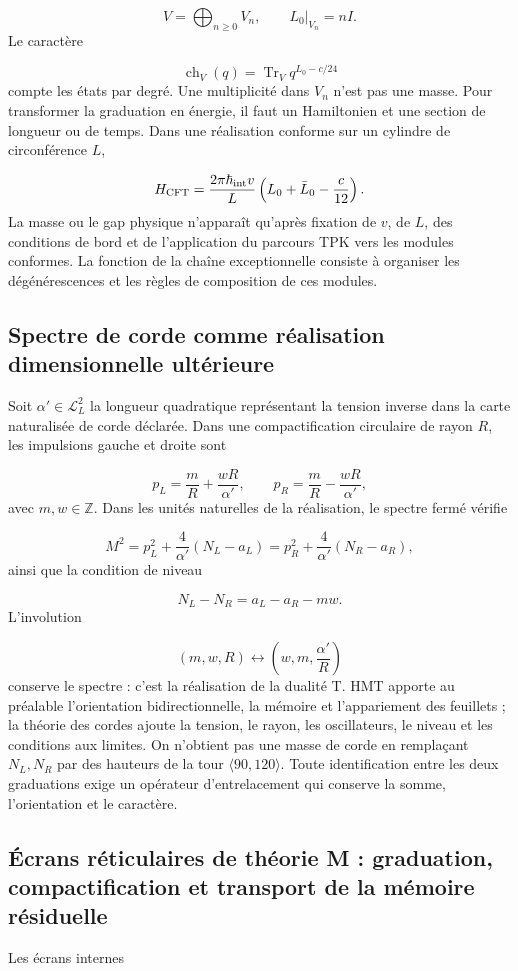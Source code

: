\[
V=\bigoplus_{n\ge0}V_n,
\qquad
L_0|_{V_n}=nI.
\]
Le caractère

\[
\operatorname{ch}_V(q)
=\operatorname{Tr}_V q^{L_0-c/24}
\]
compte les états par degré. Une multiplicité dans \(V_n\) n’est pas une masse. Pour transformer la graduation en énergie, il faut un Hamiltonien et une section de longueur ou de temps. Dans une réalisation conforme sur un cylindre de circonférence \(L\),

\[
H_{\rm CFT}
=\frac{2\pi\hbar_{\rm int}v}{L}
\left(L_0+\bar L_0-\frac{c}{12}\right).
\]
La masse ou le gap physique n’apparaît qu’après fixation de \(v\), de \(L\), des conditions de bord et de l’application du parcours TPK vers les modules conformes. La fonction de la chaîne exceptionnelle consiste à organiser les dégénérescences et les règles de composition de ces modules.

\subsection{Spectre de corde comme réalisation dimensionnelle ultérieure}
Soit \(\alpha'\in\mathcal L_L^2\) la longueur quadratique représentant la tension inverse dans la carte naturalisée de corde déclarée. Dans une compactification circulaire de rayon \(R\), les impulsions gauche et droite sont

\[
p_L=\frac{m}{R}+\frac{wR}{\alpha'},
\qquad
p_R=\frac{m}{R}-\frac{wR}{\alpha'},
\]
avec \(m,w\in\mathbb Z\). Dans les unités naturelles de la réalisation, le spectre fermé vérifie

\[
M^2=p_L^2+\frac{4}{\alpha'}(N_L-a_L)
=p_R^2+\frac{4}{\alpha'}(N_R-a_R),
\]
ainsi que la condition de niveau

\[
N_L-N_R=a_L-a_R-mw.
\]
L'involution

\[
(m,w,R)\longleftrightarrow
\left(w,m,\frac{\alpha'}{R}\right)
\]
conserve le spectre : c’est la réalisation de la dualité T. HMT apporte au préalable l’orientation bidirectionnelle, la mémoire et l’appariement des feuillets ; la théorie des cordes ajoute la tension, le rayon, les oscillateurs, le niveau et les conditions aux limites. On n’obtient pas une masse de corde en remplaçant \(N_L,N_R\) par des hauteurs de la tour \(\langle90,120\rangle\). Toute identification entre les deux graduations exige un opérateur d’entrelacement qui conserve la somme, l’orientation et le caractère.

\subsection{Écrans réticulaires de théorie M : graduation, compactification et transport de la mémoire résiduelle}
Les écrans internes

